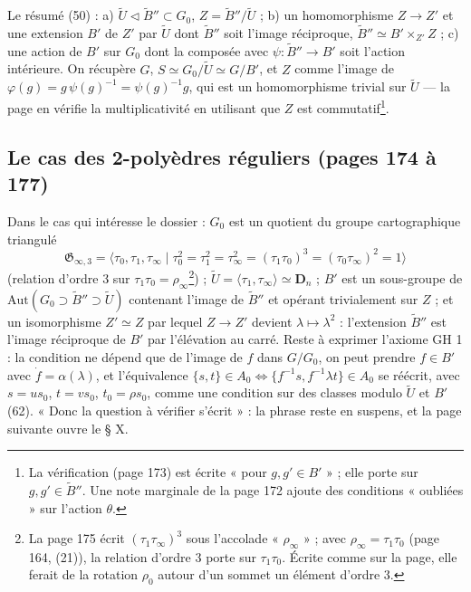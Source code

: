 \documentclass[11pt,a4paper]{article}
\begin{document}
Le résumé (50) : a) $\widetilde{U} \triangleleft \widetilde{B}'' \subset G_0$, $Z =
\widetilde{B}''/\widetilde{U}$ ; b) un homomorphisme $Z \to Z'$ et une extension
$B'$ de $Z'$ par $\widetilde{U}$ dont $\widetilde{B}''$ soit l'image
réciproque, $\widetilde{B}'' \simeq B' \times_{Z'} Z$ ; c) une action de $B'$ sur
$G_0$ dont la composée avec $\psi : \widetilde{B}'' \to B'$ soit l'action
intérieure. On récupère $G$, $S \simeq G_0/\widetilde{U} \simeq G/B'$, et $Z$
comme l'image de $\varphi(g) = g\,\psi(g)^{-1} = \psi(g)^{-1} g$, qui est un
homomorphisme trivial sur $\widetilde{U}$ --- la page en vérifie la
multiplicativité en utilisant que $Z$ est commutatif\footnote{La vérification
(page 173) est écrite « pour $g, g' \in B'$ » ; elle porte sur $g, g' \in
\widetilde{B}''$. Une note marginale de la page 172 ajoute des conditions
« oubliées » sur l'action $\theta$.}.

\subsection*{Le cas des 2-polyèdres réguliers (pages 174 à 177)}

Dans le cas qui intéresse le dossier : $G_0$ est un quotient du groupe
cartographique triangulé
\[
  \mathfrak{G}_{\infty,3} = \langle \tau_0, \tau_1, \tau_\infty \mid \tau_0^2 =
  \tau_1^2 = \tau_\infty^2 = (\tau_1\tau_0)^3 = (\tau_0\tau_\infty)^2 = 1
  \rangle
\]
(relation d'ordre $3$ sur $\tau_1\tau_0 = \rho_\infty$\footnote{La page 175 écrit $(\tau_1\tau_\infty)^3$ sous l'accolade
  « $\rho_\infty$ » ; avec $\rho_\infty = \tau_1\tau_0$ (page 164, (21)), la
  relation d'ordre $3$ porte sur $\tau_1\tau_0$. Écrite comme sur la page,
  elle ferait de la rotation $\rho_0$ autour d'un sommet un élément d'ordre
  $3$.}) ;
$\widetilde{U} = \langle \tau_1, \tau_\infty \rangle \simeq \mathbf{D}_n$ ; $B'$
est un sous-groupe de $\mathrm{Aut}(G_0 \supset \widetilde{B}'' \supset
\widetilde{U})$ contenant l'image de $\widetilde{B}''$ et opérant trivialement
sur $Z$ ; et un isomorphisme $Z' \simeq Z$ par lequel $Z \to Z'$ devient $\lambda
\mapsto \lambda^2$ : l'extension $\widetilde{B}''$ est l'image réciproque de
$B'$ par l'élévation au carré. Reste à exprimer l'axiome GH 1 : la condition ne
dépend que de l'image de $f$ dans $G/G_0$, on peut prendre $f \in B'$ avec
$\dot f = \alpha(\lambda)$, et l'équivalence $\{s, t\} \in A_0 \iff \{f^{-1}s,
f^{-1}\lambda t\} \in A_0$ se réécrit, avec $s = us_0$, $t = vs_0$, $t_0 = \rho
s_0$, comme une condition sur des classes modulo $\widetilde{U}$ et $B'$
(62). « Donc la question à vérifier s'écrit » : la phrase reste en suspens, et
la page suivante ouvre le § X.
\end{document}

